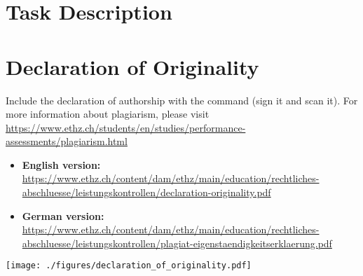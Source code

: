 
\chapter{Task Description}
%



\chapter{Declaration of Originality}\label{chap:originality}
Include the declaration of authorship with the  command (sign it and scan it). For more information
about plagiarism, please visit
\url{https://www.ethz.ch/students/en/studies/performance-assessments/plagiarism.html}

\begin{itemize}
\item \textbf{English version:}
  \url{https://www.ethz.ch/content/dam/ethz/main/education/rechtliches-abschluesse/leistungskontrollen/declaration-originality.pdf}
\item \textbf{German version:}
  \url{https://www.ethz.ch/content/dam/ethz/main/education/rechtliches-abschluesse/leistungskontrollen/plagiat-eigenstaendigkeitserklaerung.pdf}
\end{itemize}

\texttt{[image: ./figures/declaration\_of\_originality.pdf]}


